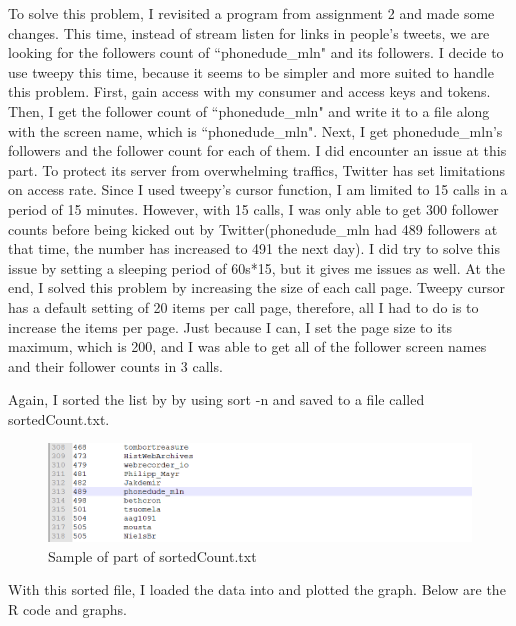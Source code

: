 \documentclass[12pt]{article}
\begin{document}
To solve this problem, I revisited a program from assignment 2 and made some changes. This time, instead of stream listen for links in people's tweets, we are looking for the followers count of ``phonedude\_mln" and its followers. I decide to use tweepy this time, because it seems to be simpler and more suited to handle this problem. First, gain access with my consumer and access keys and tokens. Then, I get the follower count of ``phonedude\_mln" and write it to a file along with the screen name, which is ``phonedude\_mln". Next, I get phonedude\_mln's followers and the follower count for each of them. I did encounter an issue at this part. To protect its server from overwhelming traffics, Twitter has set limitations on access rate. Since I used tweepy's cursor function, I am limited to 15 calls in a period of 15 minutes. However, with 15 calls, I was only able to get 300 follower counts before being kicked out by Twitter(phonedude\_mln had 489 followers at that time, the number has increased to 491 the next day). I did try to solve this issue by setting a sleeping period of 60s*15, but it gives me issues as well. At the end, I solved this problem by increasing the size of each call page. Tweepy cursor has a default setting of 20 items per call page, therefore, all I had to do is to increase the items per page. Just because I can, I set the page size to its maximum, which is 200, and I was able to get all of the follower screen names and their follower counts in 3 calls. 



\noindent
Again, I sorted the list by by using sort -n and saved to a file called sortedCount.txt.
\pagebreak

\begin{figure}[h]
\centering
\includegraphics[width=6.5in]{tSordedCount.png}
\caption{Sample of part of sortedCount.txt}
\end{figure}

\noindent
With this sorted file, I loaded the data into and plotted the graph. Below are the R code and graphs. 


\end{document}
